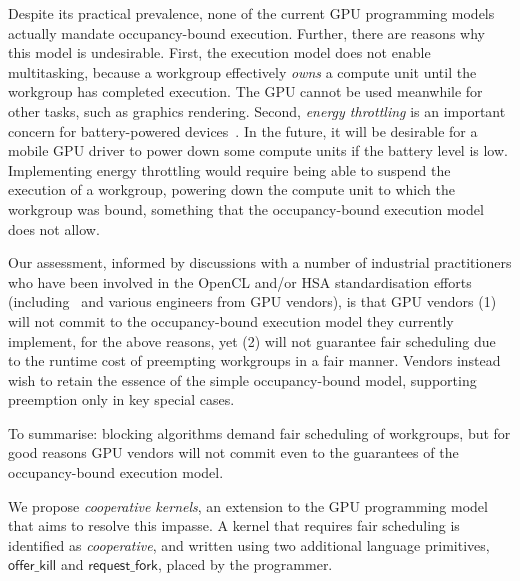 \documentclass[parskip=half,sigconf,review, anonymous=true, acmcopyrightmode=none]{acmart}
\newcommand{\offerfork}{\mathsf{request\_fork}}
\newcommand{\offerkill}{\mathsf{offer\_kill}}
\begin{document}
Despite its practical prevalence, none of the current GPU programming
models actually mandate occupancy-bound execution.  Further, there are
reasons why this model is undesirable.
First, the execution model does not enable
multitasking, because a workgroup effectively \emph{owns} a compute
unit until the workgroup has completed execution.  The GPU cannot be used meanwhile for other
tasks, such as graphics rendering.
Second, \emph{energy throttling} is
an important concern for battery-powered devices~\cite{DBLP:journals/comsur/Vallina-RodriguezC13}.  In the future, it will be desirable for a mobile GPU driver to
power down some compute units if the battery level is low.
Implementing energy
throttling would require being able to suspend the execution of a
workgroup, powering down the compute unit to which the workgroup was
bound, something that the occupancy-bound execution model does not allow.

Our assessment, informed by discussions with a number of industrial
practitioners who have been involved in the OpenCL and/or HSA
standardisation efforts
(including~\cite{PersonalCommunicationRichards,PersonalCommunicationHowes}
and various engineers from GPU vendors), is that GPU vendors (1) will
not commit to the occupancy-bound execution model they currently
implement, for the above reasons, yet (2) will not guarantee fair
scheduling due to the runtime cost of preempting workgroups in a fair
manner.  Vendors instead wish to retain the essence of the simple
occupancy-bound model, supporting preemption only in key special
cases.

%
To summarise: blocking algorithms
demand fair scheduling of workgroups, but for good reasons
GPU vendors will not commit even to the guarantees of the
occupancy-bound execution model.

We propose \emph{cooperative kernels}, an extension to the GPU
programming model that aims to resolve this impasse.  A kernel
that requires fair scheduling is identified as \emph{cooperative}, and written using two additional
language primitives, $\offerkill$ and $\offerfork$, placed by the programmer.
\end{document}
